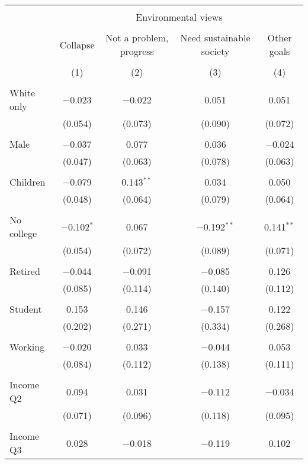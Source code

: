 
\begin{tabular}{@{\extracolsep{5pt}}lcccc} 
\\[-1.8ex]\hline 
\hline \\[-1.8ex] 
 & \multicolumn{4}{c}{Environmental views} \\ 
\cline{2-5} 
\\[-1.8ex] & Collapse & Not a problem, progress & Need sustainable society & Other goals \\ 
\\[-1.8ex] & (1) & (2) & (3) & (4)\\ 
\hline \\[-1.8ex] 
 White only & $-$0.023 & $-$0.022 & 0.051 & 0.051 \\ 
  & (0.054) & (0.073) & (0.090) & (0.072) \\ 
  & & & & \\ 
 Male & $-$0.037 & 0.077 & 0.036 & $-$0.024 \\ 
  & (0.047) & (0.063) & (0.078) & (0.063) \\ 
  & & & & \\ 
 Children & $-$0.079 & 0.143$^{**}$ & 0.034 & 0.050 \\ 
  & (0.048) & (0.064) & (0.079) & (0.064) \\ 
  & & & & \\ 
 No college & $-$0.102$^{*}$ & 0.067 & $-$0.192$^{**}$ & 0.141$^{**}$ \\ 
  & (0.054) & (0.072) & (0.089) & (0.071) \\ 
  & & & & \\ 
 Retired & $-$0.044 & $-$0.091 & $-$0.085 & 0.126 \\ 
  & (0.085) & (0.114) & (0.140) & (0.112) \\ 
  & & & & \\ 
 Student & 0.153 & 0.146 & $-$0.157 & 0.122 \\ 
  & (0.202) & (0.271) & (0.334) & (0.268) \\ 
  & & & & \\ 
 Working & $-$0.020 & 0.033 & $-$0.044 & 0.053 \\ 
  & (0.084) & (0.112) & (0.138) & (0.111) \\ 
  & & & & \\ 
 Income Q2 & 0.094 & 0.031 & $-$0.112 & $-$0.034 \\ 
  & (0.071) & (0.096) & (0.118) & (0.095) \\ 
  & & & & \\ 
 Income Q3 & 0.028 & $-$0.018 & $-$0.119 & 0.102 \\ 

\end{tabular}
